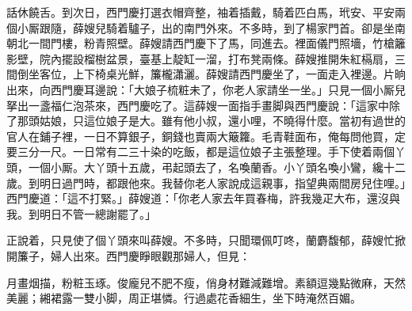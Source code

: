 話休饒舌。到次日，西門慶打選衣帽齊整，袖着插戴，騎着匹白馬，玳安、平安兩個小厮跟隨，薛嫂兒騎着驢子，出的南門外來。不多時，到了楊家門首。卻是坐南朝北一間門樓，粉青照壁。薛嫂請西門慶下了馬，同進去。裡面儀門照墻，竹槍籬影壁，院內擺設榴樹盆景，臺基上靛缸一溜，打布凳兩條。{}薛嫂推開朱紅槅扇，三間倒坐客位，上下椅桌光鮮，簾櫳瀟灑。薛嫂請西門慶坐了，一面走入裡邊。片晌出來，向西門慶耳邊說：「大娘子梳粧未了，你老人家請坐一坐。」只見一個小厮兒拏出一盞福仁泡茶來，西門慶吃了。這薛嫂一面指手畫脚與西門慶說：「這家中除了那頭姑娘，只這位娘子是大。雖有他小叔，還小哩，不曉得什麼。當初有過世的官人在鋪子裡，一日不算銀子，銅錢也賣兩大簸籮。毛青鞋面布，{}俺每問他買，定要三分一尺。一日常有二三十染的吃飯，都是這位娘子主張整理。{}手下使着兩個丫頭，一個小厮。大丫頭十五歲，弔起頭去了，名喚蘭香。小丫頭名喚小鸞，纔十二歲。到明日過門時，都跟他來。我替你老人家說成這親事，指望典兩間房兒住哩。」西門慶道：「這不打緊。」薛嫂道：「你老人家去年買春梅，{}許我幾疋大布，還沒與我。到明日不管一總謝罷了。」

正說着，只見使了個丫頭來叫薛嫂。不多時，只聞環佩叮咚，蘭麝馥郁，薛嫂忙掀開簾子，婦人出來。西門慶睜眼觀那婦人，但見：

\begin{myquote} 
月畫烟描，粉粧玉琢。俊龐兒不肥不瘦，俏身材難減難增。素額逗幾點微麻，天然美麗；緗裙露一雙小脚，周正堪憐。行過處花香細生，坐下時淹然百媚。
\end{myquote} 

